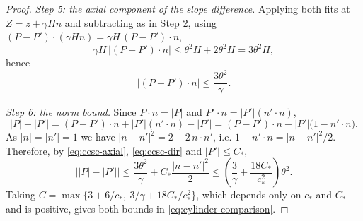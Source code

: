 \begin{proof}
\emph{Step 5: the axial component of the slope difference.}
Applying both fits at $Z=z+\gamma Hn$ and subtracting as in Step 2, using
$(P-P')\cdot(\gamma Hn)=\gamma H\,(P-P')\cdot n$,
\[
  \gamma H\,\bigl|(P-P')\cdot n\bigr|\le\theta^2H+2\theta^2H=3\theta^2H,
\]
hence
\begin{equation}\label{eq:ccsc-axial}
  \bigl|(P-P')\cdot n\bigr|\le\frac{3\theta^2}{\gamma}.
\end{equation}

\emph{Step 6: the norm bound.}
Since $P\cdot n=|P|$ and $P'\cdot n=|P'|(n'\cdot n)$,
\[
  |P|-|P'|=(P-P')\cdot n+|P'|(n'\cdot n)-|P'|
   =(P-P')\cdot n-|P'|\bigl(1-n'\cdot n\bigr).
\]
As $|n|=|n'|=1$ we have $|n-n'|^2=2-2\,n\cdot n'$, i.e.
$1-n'\cdot n=|n-n'|^2/2$. Therefore, by \eqref{eq:ccsc-axial},
\eqref{eq:ccsc-dir} and $|P'|\le C_*$,
\[
  \bigl||P|-|P'|\bigr|
   \le\frac{3\theta^2}{\gamma}+C_*\frac{|n-n'|^2}2
   \le\left(\frac3\gamma+\frac{18C_*}{c_*^2}\right)\theta^2 .
\]
Taking
$C=\max\{3+6/c_*,\ 3/\gamma+18C_*/c_*^2\}$, which depends only on $c_*$ and
$C_*$ and is positive, gives both bounds in
\eqref{eq:cylinder-comparison}.
\end{proof}
